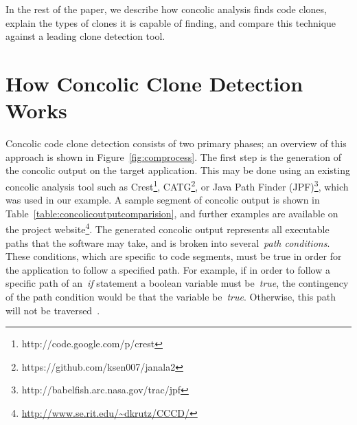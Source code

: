\documentclass{sig-alternate}
\begin{document}
In the rest of the paper, we describe how concolic analysis finds code clones, explain the types of clones it is capable of finding, and compare this technique against a leading clone detection tool.




\vspace{-0.08in}
\section{How Concolic Clone Detection Works}
\label{sec: howconcolicworks}

Concolic code clone detection consists of two primary phases; an overview of this approach is shown in Figure~\ref{fig:comprocess}. The first step is the generation of the concolic output on the target application. This may be done using an existing concolic analysis tool such as Crest\footnote{http://code.google.com/p/crest}, CATG\footnote{https://github.com/ksen007/janala2}, or Java Path Finder (JPF)\footnote{http://babelfish.arc.nasa.gov/trac/jpf}, which was used in our example. A sample segment of concolic output is shown in Table~\ref{table:concolicoutputcomparision}, and further examples are available on the project website\footnote{\url{http://www.se.rit.edu/~dkrutz/CCCD/}}. The generated concolic output represents all executable paths that the software may take, and is broken into several~\emph{path conditions}. These conditions, which are specific to code segments, must be true in order for the application to follow a specified path. For example, if in order to follow a specific path of an~\emph{if} statement a boolean variable must be~\emph{true}, the contingency of the path condition would be that the variable be~\emph{true}. Otherwise, this path will not be traversed~\cite{Sen:2005:CCU:1081706.1081750}.
\end{document}
